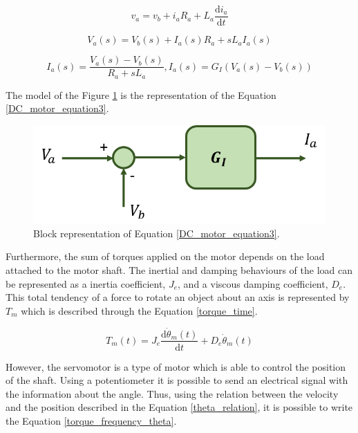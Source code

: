 \begin{equation}\label{DC_motor_equation1}
v_{a}= v_{b}+i_{a} R_{a}+L_{a}\frac{\mathrm{d} i_{a}}{\mathrm{d} t}
\end{equation}

\begin{equation}\label{DC_motor_equation2}
V_{a}(s)= V_{b}(s)+I_{a}(s) R_{a}+sL_{a}I_{a}(s)
\end{equation}

\begin{equation}\label{DC_motor_equation3}
I_{a}(s)= \frac{V_{a}(s)-V_{b}(s)}{R_{a}+sL_{a}} , I_{a}(s)= G_{I}(V_{a}(s)-V_{b}(s))
\end{equation}

The model of the Figure \ref{model1} is the representation of the Equation \ref{DC_motor_equation3}.

\begin{figure}[H]
\centering
\includegraphics[scale=0.6]{figures/model1.png}
\caption{Block representation of Equation \ref{DC_motor_equation3}.}
\label{model1}
\end{figure}

Furthermore, the sum of torques applied on the motor depends on the load attached to the motor shaft. The inertial and damping behaviours of the load can be represented as a inertia coefficient, $J_{e}$, and a viscous damping coefficient, $D_{e}$. This total tendency of a force to rotate an object about an axis is represented by $T_{m}$ which is described through the Equation \ref{torque_time}. 

\begin{equation}\label{torque_time}
T_{m}(t)= J_{e}\frac{\mathrm{d} \dot{\theta}_{m}(t)}{\mathrm{d} t}+D_{e}\dot{\theta}_{m}(t)
\end{equation}

However, the servomotor is a type of motor which is able to control the position of the shaft. Using a potentiometer it is possible to send an electrical signal with the information about the angle. Thus, using the relation between the velocity and the position described in the Equation \ref{theta_relation}, it is possible to write the Equation \ref{torque_frequency_theta}.

